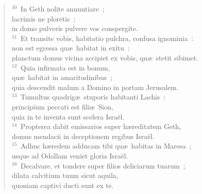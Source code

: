 \begin{verse}
${}^{10}$~In Geth nolite annuntiare~;\\ lacrimis ne ploretis~;\\ in domo pulveris pulvere vos conspergite.\\
${}^{11}$~Et transite vobis, habitatio pulchra, confusa ignominia~:\\ non est egressa qu\ae\ habitat in exitu~:\\ planctum domus vicina accipiet ex vobis, qu\ae\ stetit sibimet.\\
${}^{12}$~Quia infirmata est in bonum,\\ qu\ae\ habitat in amaritudinibus~;\\ quia descendit malum a Domino in portam Jerusalem.\\
${}^{13}$~Tumultus quadrig\ae\ stuporis habitanti Lachis~:\\ principium peccati est fili\ae\ Sion,\\ quia in te inventa sunt scelera Isra\"el.\\
${}^{14}$~Propterea dabit emissarios super h\ae reditatem Geth,\\ domus mendacii in deceptionem regibus Isra\"el.\\
${}^{15}$~Adhuc h\ae redem adducam tibi qu\ae\ habitas in Maresa~;\\ usque ad Odollam veniet gloria Isra\"el.\\
${}^{16}$~Decalvare, et tondere super filios deliciarum tuarum~;\\ dilata calvitium tuum sicut aquila,\\ quoniam captivi ducti sunt ex te.\end{verse}


